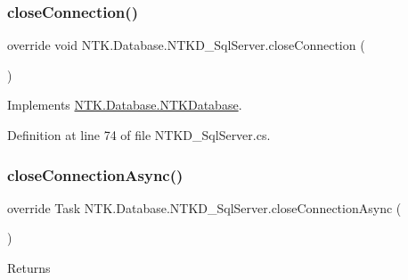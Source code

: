 \mbox{\label{class_n_t_k_1_1_database_1_1_n_t_k_d___sql_server_ad5f62cdabc17dcdf224b2ff49ce07fa6}} 
\subsubsection{\texorpdfstring{closeConnection()}{closeConnection()}}
{\footnotesize\ttfamily override void N\+T\+K.\+Database.\+N\+T\+K\+D\+\_\+\+Sql\+Server.\+close\+Connection (\begin{DoxyParamCaption}{ }\end{DoxyParamCaption})\hspace{0.3cm}{\ttfamily [virtual]}}







Implements \mbox{\hyperlink{class_n_t_k_1_1_database_1_1_n_t_k_database_a0c7312d31c1a7df56e7a70ae72c08d89}{N\+T\+K.\+Database.\+N\+T\+K\+Database}}.



Definition at line 74 of file N\+T\+K\+D\+\_\+\+Sql\+Server.\+cs.

\mbox{\label{class_n_t_k_1_1_database_1_1_n_t_k_d___sql_server_abfb6ed70d7c551c05d54efcc61598a07}} 
\subsubsection{\texorpdfstring{closeConnectionAsync()}{closeConnectionAsync()}}
{\footnotesize\ttfamily override Task N\+T\+K.\+Database.\+N\+T\+K\+D\+\_\+\+Sql\+Server.\+close\+Connection\+Async (\begin{DoxyParamCaption}{ }\end{DoxyParamCaption})\hspace{0.3cm}{\ttfamily [virtual]}}





\begin{DoxyReturn}{Returns}

\end{DoxyReturn}


